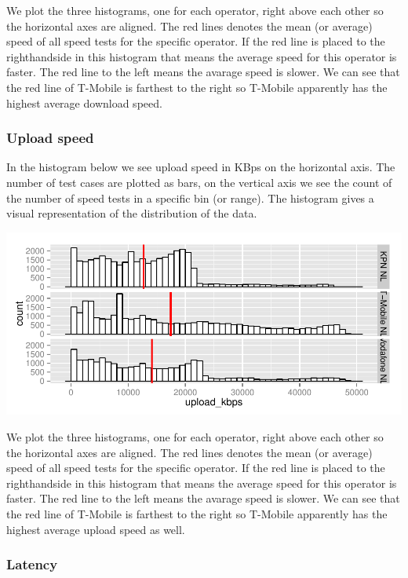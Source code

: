 \documentclass[]{article}
\begin{document}
We plot the three histograms, one for each operator, right above each
other so the horizontal axes are aligned. The red lines denotes the mean
(or average) speed of all speed tests for the specific operator. If the
red line is placed to the righthandside in this histogram that means the
average speed for this operator is faster. The red line to the left
means the avarage speed is slower. We can see that the red line of
T-Mobile is farthest to the right so T-Mobile apparently has the highest
average download speed.

\subsubsection{Upload speed}\label{upload-speed}

In the histogram below we see upload speed in KBps on the horizontal
axis. The number of test cases are plotted as bars, on the vertical axis
we see the count of the number of speed tests in a specific bin (or
range). The histogram gives a visual representation of the distribution
of the data.

\includegraphics{speedtest-analysis_files/figure-latex/uploadspeed-1.pdf}

We plot the three histograms, one for each operator, right above each
other so the horizontal axes are aligned. The red lines denotes the mean
(or average) speed of all speed tests for the specific operator. If the
red line is placed to the righthandside in this histogram that means the
average speed for this operator is faster. The red line to the left
means the avarage speed is slower. We can see that the red line of
T-Mobile is farthest to the right so T-Mobile apparently has the highest
average upload speed as well.

\subsubsection{Latency}\label{latency}
\end{document}
